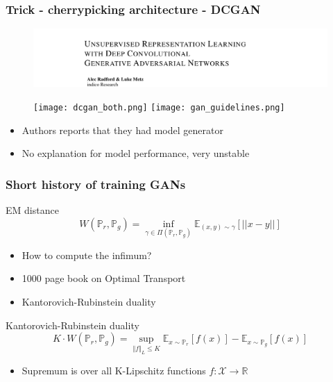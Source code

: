 \documentclass{Bredelebeamer}
\begin{document}
\begin{frame}
	\frametitle{Trick - cherrypicking architecture - DCGAN}
	\begin{figure}[h!]
		\centering
		\includegraphics[width=\textwidth]{dcgan_paper.png}
	\end{figure}
\begin{figure}
	\begin{overprint}
  \texttt{[image: dcgan\_both.png]}
  \texttt{[image: gan\_guidelines.png]}
	\end{overprint}
\end{figure}
	\begin{itemize}[<+(2)->]
		\item Authors reports that they had model generator \footnotemark
		\item No explanation for model performance, very unstable
	\end{itemize}
\end{frame}
\begin{frame}
	\frametitle{Short history of training GANs}
        \pause
	\begin{exampleblock}{EM distance}
	\[
		W(\mathbb{P}_r, \mathbb{P}_g) = \inf_{\gamma \in \Pi(\mathbb{P}_r, \mathbb{P}_g)} {\mathbb{E}_{(x, y) \sim \gamma}} \left[ \lvert \lvert x - y \lvert \lvert \right]
	\]
	\end{exampleblock}
	\begin{itemize}[<+(1)->]
		\item How to compute the infimum?
		\item 1000 page book on Optimal Transport \footnotemark
		\item Kantorovich-Rubinstein duality
	\end{itemize}
	\pause
	\begin{exampleblock}{Kantorovich-Rubinstein duality}
	\[
		K \cdot W(\mathbb{P}_r, \mathbb{P}_g) = \sup_{\Vert f \Vert_L \leq K} \mathbb{E}_{x \sim \mathbb{P}_r} \left[ f(x) \right] - \mathbb{E}_{x \sim \mathbb{P}_g} \left[ f(x) \right]
	\]
	\end{exampleblock}
	\pause
	\begin{itemize}
		\item Supremum is over all K-Lipschitz functions $f: \mathcal{X} \rightarrow \mathbb{R} $
	\end{itemize}
\end{frame}
\end{document}
